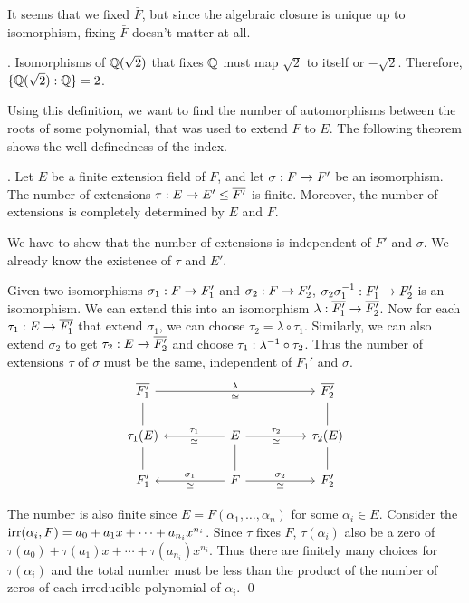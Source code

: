 It seems that we fixed \(\bar{F}\), but since the algebraic closure is unique up to isomorphism, fixing \(\bar{F}\) doesn't matter at all.

\ex. Isomorphisms of \(\mathbb{Q}(\sqrt{2})\) that fixes \(\mathbb{Q}\) must map \(\sqrt{2}\) to itself or \(-\sqrt{2}\). Therefore, \(\{\mathbb{Q}(\sqrt{2}) : \mathbb{Q}\} = 2\).

Using this definition, we want to find the number of automorphisms between the roots of some polynomial, that was used to extend \(F\) to \(E\). The following theorem shows the well-definedness of the index.

\thm. Let \(E\) be a finite extension field of \(F\), and let \(\sigma : F \rightarrow F'\) be an isomorphism. The number of extensions \(\tau : E \ra E' \leq \bar{F'}\) is finite. Moreover, the number of extensions is completely determined by \(E\) and \(F\).

\pf We have to show that the number of extensions is independent of \(F'\) and \(\sigma\). We already know the existence of \(\tau\) and \(E'\).

Given two isomorphisms \(\sigma_1 : F \rightarrow F_1'\) and \(\sigma_2 : F \rightarrow F_2'\), \(\sigma_2 \sigma_1^{-1} : F_1' \rightarrow F_2'\) is an isomorphism. We can extend this into an isomorphism \(\lambda : \bar{F_1'} \ra \bar{F_2'}\). Now for each \(\tau_1 : E \ra \bar{F_1'}\) that extend \(\sigma_1\), we can choose \(\tau_2 = \lambda \circ \tau_1\). Similarly, we can also extend \(\sigma_2\) to get \(\tau_2 : E \ra \bar{F_2'}\) and choose \(\tau_1 : \lambda^{-1} \circ \tau_2\). Thus the number of extensions \(\tau\) of \(\sigma\) must be the same, independent of \(F_1'\) and \(\sigma\).
\[
    \begin{tikzcd}
        \bar{F_1'} \arrow[dash]{d} \arrow{rrrr}{\lambda}[swap]{\simeq} && && \bar{F_2'} \arrow[dash]{d} \\
        \tau_1(E) \arrow[dash]{d}&& E \arrow{ll}{\simeq}[swap]{\tau_1} \arrow{rr}{\tau_2}[swap]{\simeq} \arrow[dash]{d} && \tau_2(E) \arrow[dash]{d} \\
        F_1' && F \arrow{ll}{\simeq}[swap]{\sigma_1} \arrow{rr}{\sigma_2}[swap]{\simeq} && F_2'
    \end{tikzcd}
\]

The number is also finite since \(E = F(\alpha_1, \dots, \alpha_n)\) for some \(\alpha_i \in E\). Consider the \(\mathrm{irr}(\alpha_i, F) = a_0 + a_1 x + \cdots + a_{n_i} x^{n_i}\). Since \(\tau\) fixes \(F\), \(\tau(\alpha_i)\) also be a zero of \(\tau(a_0) + \tau(a_1) x + \cdots + \tau(a_{n_i}) x^{n_i}\). Thus there are finitely many choices for \(\tau(\alpha_i)\) and the total number must be less than the product of the number of zeros of each irreducible polynomial of \(\alpha_i\). \qed

\smallskip
